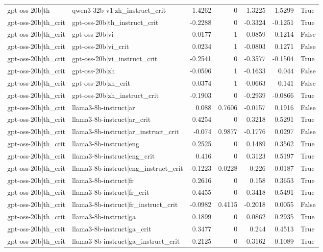 \begin{table}
\begin{tabular}{l l r r r r l}
gpt-oss-20b|th & qwen3-32b-v1|zh_instruct_crit & 1.4262 & 0 & 1.3225 & 1.5299 & True \\
gpt-oss-20b|th_crit & gpt-oss-20b|th_instruct_crit & -0.2288 & 0 & -0.3324 & -0.1251 & True \\
gpt-oss-20b|th_crit & gpt-oss-20b|vi & 0.0177 & 1 & -0.0859 & 0.1214 & False \\
gpt-oss-20b|th_crit & gpt-oss-20b|vi_crit & 0.0234 & 1 & -0.0803 & 0.1271 & False \\
gpt-oss-20b|th_crit & gpt-oss-20b|vi_instruct_crit & -0.2541 & 0 & -0.3577 & -0.1504 & True \\
gpt-oss-20b|th_crit & gpt-oss-20b|zh & -0.0596 & 1 & -0.1633 & 0.044 & False \\
gpt-oss-20b|th_crit & gpt-oss-20b|zh_crit & 0.0374 & 1 & -0.0663 & 0.141 & False \\
gpt-oss-20b|th_crit & gpt-oss-20b|zh_instruct_crit & -0.1903 & 0 & -0.2939 & -0.0866 & True \\
gpt-oss-20b|th_crit & llama3-8b-instruct|ar & 0.088 & 0.7606 & -0.0157 & 0.1916 & False \\
gpt-oss-20b|th_crit & llama3-8b-instruct|ar_crit & 0.4254 & 0 & 0.3218 & 0.5291 & True \\
gpt-oss-20b|th_crit & llama3-8b-instruct|ar_instruct_crit & -0.074 & 0.9877 & -0.1776 & 0.0297 & False \\
gpt-oss-20b|th_crit & llama3-8b-instruct|eng & 0.2525 & 0 & 0.1489 & 0.3562 & True \\
gpt-oss-20b|th_crit & llama3-8b-instruct|eng_crit & 0.416 & 0 & 0.3123 & 0.5197 & True \\
gpt-oss-20b|th_crit & llama3-8b-instruct|eng_instruct_crit & -0.1223 & 0.0228 & -0.226 & -0.0187 & True \\
gpt-oss-20b|th_crit & llama3-8b-instruct|fr & 0.2616 & 0 & 0.158 & 0.3653 & True \\
gpt-oss-20b|th_crit & llama3-8b-instruct|fr_crit & 0.4455 & 0 & 0.3418 & 0.5491 & True \\
gpt-oss-20b|th_crit & llama3-8b-instruct|fr_instruct_crit & -0.0982 & 0.4115 & -0.2018 & 0.0055 & False \\
gpt-oss-20b|th_crit & llama3-8b-instruct|ga & 0.1899 & 0 & 0.0862 & 0.2935 & True \\
gpt-oss-20b|th_crit & llama3-8b-instruct|ga_crit & 0.3477 & 0 & 0.244 & 0.4513 & True \\
gpt-oss-20b|th_crit & llama3-8b-instruct|ga_instruct_crit & -0.2125 & 0 & -0.3162 & -0.1089 & True \\

\end{tabular}
\end{table}
